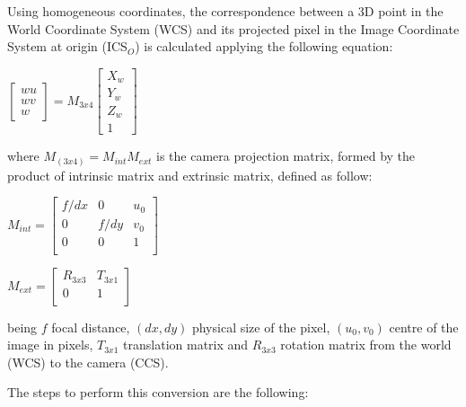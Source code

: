Using homogeneous coordinates, the correspondence between a 3D point in the World Coordinate System (WCS) and its projected pixel in the Image Coordinate System at origin (ICS$_O$) is calculated applying the following equation:

\begin{center}
	$
	\begin{bmatrix} wu \\ wv \\ w \end{bmatrix}
	=
	M_{3x4}
	\begin{bmatrix} X_w \\ Y_w \\ Z_w \\ 1 \end{bmatrix}
	$
\end{center}
where $M_{(3x4)}=M_{int}M_{ext}$ is the camera projection matrix, formed by the product of intrinsic matrix and extrinsic matrix, defined as follow:
\begin{center}
	$
	M_{int}
	=
	\begin{bmatrix}
		f/dx & 0 & u_0 \\
		0 & f/dy & v_0 \\
		0 & 0 & 1 \\
	\end{bmatrix}
	$
\end{center}
\begin{center}
	$
	M_{ext}
	=
	\begin{bmatrix}
		R_{3x3} & T_{3x1} \\
		0 & 1 \\
	\end{bmatrix}
	$
\end{center}

being $f$ focal distance, $(dx,dy)$ physical size of the pixel, $(u_0, v_0)$ centre of the image in pixels, $T_{3x1}$ translation matrix and $R_{3x3}$ rotation matrix from the world (WCS) to the camera (CCS). 

The steps to perform this conversion are the following:

